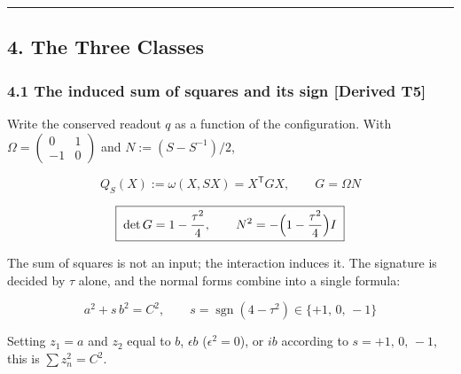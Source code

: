 \documentclass[
  a4paper,
]{article}
\begin{document}
\begin{center}\rule{0.5\linewidth}{0.5pt}\end{center}

\subsection{4. The Three Classes}\label{the-three-classes}

\subsubsection{4.1 The induced sum of squares and its sign {[}Derived
T5{]}}\label{the-induced-sum-of-squares-and-its-sign-derived-t5}

Write the conserved readout \(q\) as a function of the configuration.
With \(\Omega=\begin{pmatrix}0&1\\-1&0\end{pmatrix}\) and
\(N:=(S-S^{-1})/2\),

\[
Q_S(X):=\omega(X,SX)=X^{\mathsf T}GX,\qquad G=\Omega N
\]

\[
\boxed{\;\det G=1-\frac{\tau^2}{4},\qquad N^2=-\Bigl(1-\frac{\tau^2}{4}\Bigr)I\;}
\]

The sum of squares is not an input; the interaction induces it. The
signature is decided by \(\tau\) alone, and the normal forms combine
into a single formula:

\[
\boxed{\;a^2+s\,b^2=C^2,\qquad s=\operatorname{sgn}(4-\tau^2)\in\{+1,\,0,\,-1\}\;}
\]

Setting \(z_1=a\) and \(z_2\) equal to \(b\), \(\epsilon b\)
(\(\epsilon^2=0\)), or \(ib\) according to \(s=+1,\,0,\,-1\), this is
\(\sum z_n^2=C^2\).
\end{document}
